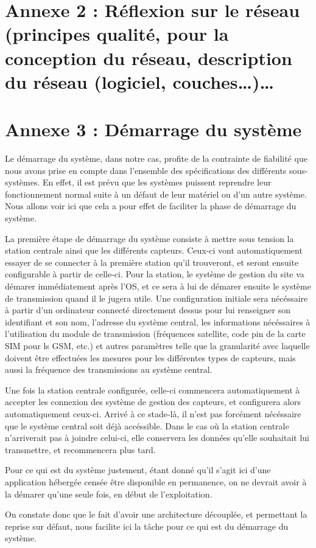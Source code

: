 \section{Annexe 2 : Réflexion sur le réseau (principes qualité, pour la conception du réseau,
description du réseau (logiciel, couches…)…}

\section{Annexe 3 : Démarrage du système}

Le démarrage du système, dans notre cas, profite de la contrainte de fiabilité que nous avons prise en compte dans l'ensemble des spécifications des différents sous-systèmes. En effet, il est prévu que les systèmes puissent reprendre leur fonctionnement normal suite à un défaut de leur matériel ou d'un autre système. Nous allons voir ici que cela a pour effet de faciliter la phase de démarrage du système.

La première étape de démarrage du système consiste à mettre sous tension la station centrale ainsi que les différents capteurs. Ceux-ci vont automatiquement essayer de se connecter à la première station qu'il trouveront, et seront ensuite configurable à partir de celle-ci. Pour la station, le système de gestion du site va démarer immédiatement après l'OS, et ce sera à lui de démarer ensuite le système de transmission quand il le jugera utile. Une configuration initiale sera nécéssaire à partir d'un ordinateur connecté directement dessus pour lui renseigner son identifiant et son nom, l'adresse du système central, les informations nécéssaires à l'utilisation du module de transmission (fréquences satellite, code pin de la carte SIM pour ls GSM, etc.) et autres paramètres telle que la granularité avec laquelle doivent être effectuées les mesures pour les différentes types de capteurs, mais aussi la fréquence des transmissions au système central.

Une fois la station centrale configurée, celle-ci commencera automatiquement à accepter les connexion des système de gestion des capteurs, et configurera alors automatiquement ceux-ci. Arrivé à ce stade-là, il n'est pas forcément nécéssaire que le système central soit déjà accéssible. Dans le cas où la station centrale n'arriverait pas à joindre celui-ci, elle conservera les données qu'elle souhaitait lui transmettre, et recommencera plus tard.

Pour ce qui est du système justement, étant donné qu'il s'agit ici d'une application hébergée censée être disponible en permanence, on ne devrait avoir à la démarer qu'une seule fois, en début de l'exploitation.

On constate donc que le fait d'avoir une architecture découplée, et permettant la reprise sur défaut, nous facilite ici la tâche pour ce qui est du démarrage du système.